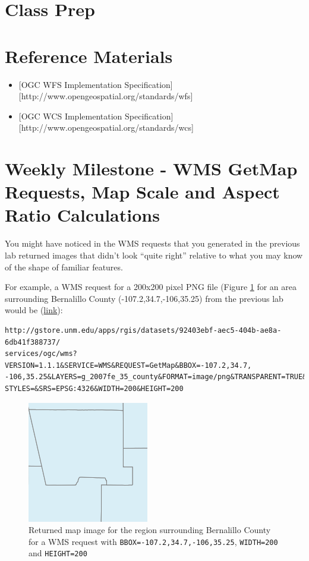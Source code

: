 \documentclass[]{book}
\begin{document}
\section{Class Prep}\label{week07-prep}

\section{Reference Materials}\label{week07-reference}

\begin{itemize}
\item
  {[}OGC WFS Implementation
  Specification{]}{[}http://www.opengeospatial.org/standards/wfs{]}
\item
  {[}OGC WCS Implementation
  Specification{]}{[}http://www.opengeospatial.org/standards/wcs{]}
\end{itemize}

\section{Weekly Milestone - WMS GetMap Requests, Map Scale and Aspect
Ratio Calculations}\label{week07-milestone}

You might have noticed in the WMS requests that you generated in the
previous lab returned images that didn't look ``quite right'' relative
to what you may know of the shape of familiar features.

For example, a WMS request for a 200x200 pixel PNG file (Figure
\ref{fig:bernalillo-01} for an area surrounding Bernalillo County
(-107.2,34.7,-106,35.25) from the previous lab would be
(\href{http://gstore.unm.edu/apps/rgis/datasets/92403ebf-aec5-404b-ae8a-6db41f388737/services/ogc/wms?VERSION=1.1.1\&SERVICE=WMS\&REQUEST=GetMap\&BBOX=-107.2,34.7,-106,35.25\&LAYERS=g_2007fe_35_county\&FORMAT=image/png\&TRANSPARENT=TRUE\&STYLES=\&SRS=EPSG:4326\&WIDTH=200\&HEIGHT=200}{link}):

\begin{verbatim}
http://gstore.unm.edu/apps/rgis/datasets/92403ebf-aec5-404b-ae8a-6db41f388737/
services/ogc/wms?VERSION=1.1.1&SERVICE=WMS&REQUEST=GetMap&BBOX=-107.2,34.7,
-106,35.25&LAYERS=g_2007fe_35_county&FORMAT=image/png&TRANSPARENT=TRUE&
STYLES=&SRS=EPSG:4326&WIDTH=200&HEIGHT=200
\end{verbatim}

\begin{figure}[htbp]
\centering
\includegraphics{images/bernalillo_01.png}
\caption{Returned map image for the region surrounding Bernalillo County
for a WMS request with \texttt{BBOX=-107.2,34.7,-106,35.25},
\texttt{WIDTH=200} and \texttt{HEIGHT=200}\label{fig:bernalillo-01}}
\end{figure}
\end{document}

